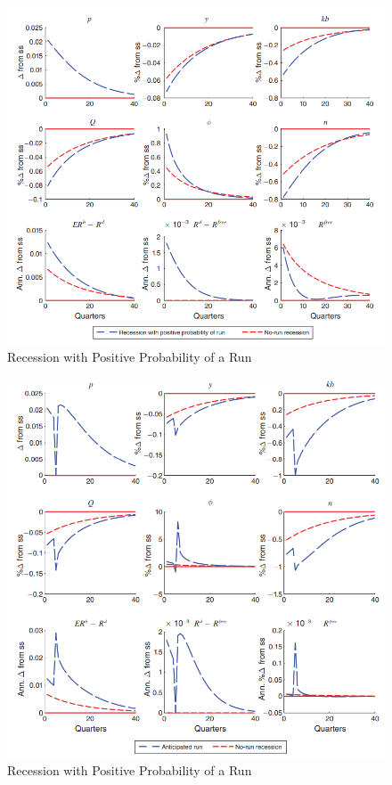 \begin{frame}
    \begin{figure}
        \centering
        \includegraphics[height = 0.9\textheight]{fig/fig5.png}
        \caption{Recession with Positive Probability of a Run}
    \end{figure}
\end{frame}

\begin{frame}
    \begin{figure}
        \centering
        \includegraphics[height = 0.9\textheight]{fig/fig6.png}
        \caption{Recession with Positive Probability of a Run}
    \end{figure}
\end{frame}

